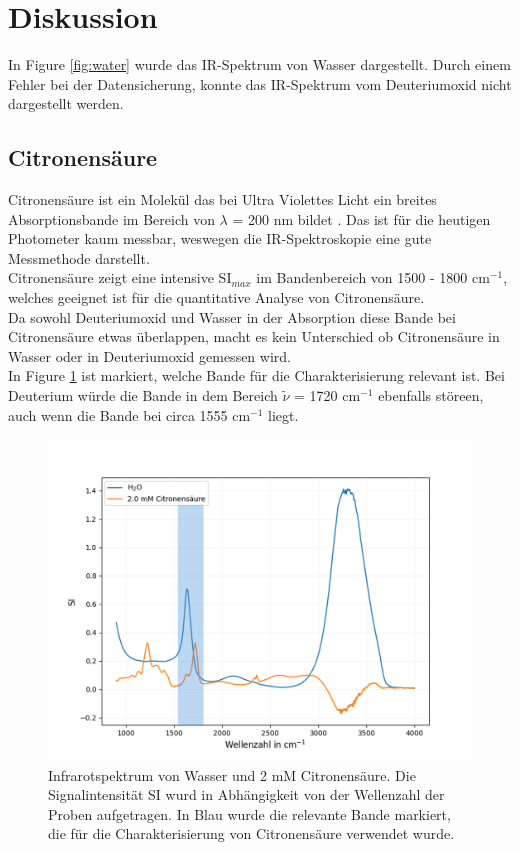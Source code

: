 \documentclass[10pt,a4paper]{article}
\begin{document}
	
	\section{Diskussion}
			In Figure \ref{fig:water} wurde das IR-Spektrum von Wasser dargestellt. Durch einem Fehler bei der Datensicherung, konnte das IR-Spektrum vom Deuteriumoxid nicht dargestellt werden.

			\subsection{Citronensäure}
				Citronensäure ist ein Molekül das bei Ultra Violettes Licht ein breites Absorptionsbande im Bereich von $\lambda$ = 200 nm bildet \cite{Citricacid_UV}. Das ist für die heutigen Photometer kaum messbar, weswegen die IR-Spektroskopie eine gute Messmethode darstellt.\\
				Citronensäure zeigt eine intensive SI$_{max}$ im Bandenbereich von 1500 - 1800 cm$^{-1}$, welches geeignet ist für die quantitative Analyse von Citronensäure.\\
				Da sowohl Deuteriumoxid und Wasser in der Absorption diese Bande bei Citronensäure etwas überlappen, macht es kein Unterschied ob Citronensäure in Wasser oder in Deuteriumoxid gemessen wird. \\
				In Figure \ref{fig:wasser_Citrat_full} ist markiert, welche Bande für die Charakterisierung relevant ist. Bei Deuterium würde die Bande in dem Bereich $\tilde{\nu}$ = 1720 cm$^{-1}$ ebenfalls störeen, auch wenn die Bande bei circa 1555 cm$^{-1}$  \cite{infrared_d2o_h2o} liegt.
				
				\begin{figure}[H]
					\centering
					\includegraphics[scale=0.65]{water_citricacid.png}
					\caption{Infrarotspektrum von Wasser und 2 mM Citronensäure. Die Signalintensität SI wurd in Abhängigkeit von der Wellenzahl der Proben aufgetragen. In Blau wurde die relevante Bande markiert, die für die Charakterisierung von Citronensäure verwendet wurde.}
					\label{fig:wasser_Citrat_full}
				\end{figure}
				
\end{document}
